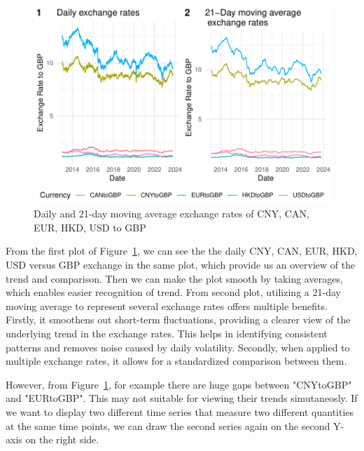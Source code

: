 \documentclass{article}\usepackage[]{graphicx}\usepackage[]{xcolor}
\makeatletter
\def\maxwidth{ %
  \ifdim\Gin@nat@width>\linewidth
    \linewidth
  \else
    \Gin@nat@width
  \fi
}
\newenvironment{knitrout}{}{} %
\makeatother
\begin{document}
\begin{figure}
\begin{knitrout}
{\centering \includegraphics[width=\maxwidth]{figure/beamer-unnamed-chunk-2-1} 

}


\end{knitrout}
\centering
\caption{Daily and 21-day moving average exchange rates of CNY, CAN, EUR, HKD, USD to GBP}
\label{fig:all exchange rates}
\end{figure}


From the first plot of Figure~\ref{fig:all exchange rates}, we can see the the daily CNY, CAN, EUR, HKD, USD versus GBP exchange in the same plot, which provide us an overview of the trend and comparison. Then we can make the plot smooth by taking averages, which enables easier recognition of trend. From second plot, utilizing a 21-day moving average to represent several exchange rates offers multiple benefits. Firstly, it smoothens out short-term fluctuations, providing a clearer view of the underlying trend in the exchange rates. This helps in identifying consistent patterns and removes noise caused by daily volatility. Secondly, when applied to multiple exchange rates, it allows for a standardized comparison between them.

However, from Figure~\ref{fig:all exchange rates}, for example there are huge gaps between "CNYtoGBP" and "EURtoGBP". This may not suitable for viewing their trends simutaneosly. If we want to display two different time series that measure two different quantities at the same time points, we can draw the second series again on the second Y-axis on the right side.
\end{document}
